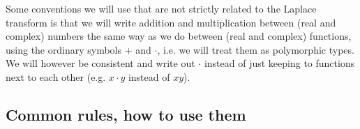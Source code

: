 Some conventions we will use that are not strictly related to the Laplace
transform is that we will write addition and multiplication between (real and complex) numbers
the same way as we do between (real and complex) functions, using the ordinary
symbols $+$ and $\cdot$, i.e. we will treat them as polymorphic types. 
We will however be consistent and write out $\cdot$ instead of just keeping to
functions next to each other (e.g. $x \cdot y$ instead of $xy$).
\subsection{Common rules, how to use them}\label{sec:common-rules}

